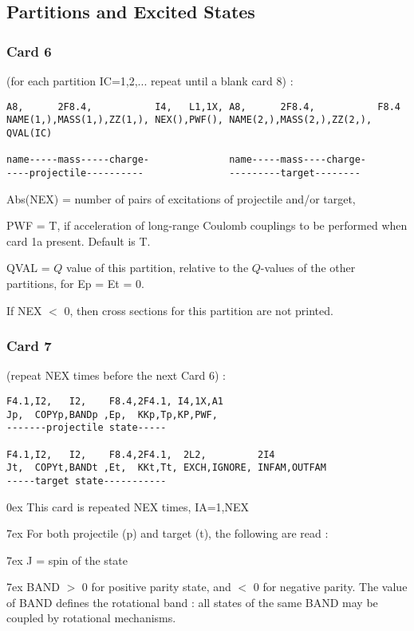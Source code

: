 \documentclass[11pt]{article}
\begin{document}
 
\newpage
\subsection{Partitions and Excited States}
%
\subsubsection*{Card 6}
(for each partition IC=1,2,... repeat until a blank card 8) :
\begin{verbatim}
A8,      2F8.4,           I4,   L1,1X, A8,      2F8.4,           F8.4
NAME(1,),MASS(1,),ZZ(1,), NEX(),PWF(), NAME(2,),MASS(2,),ZZ(2,), QVAL(IC)

name-----mass-----charge-              name-----mass----charge-
----projectile----------               ---------target--------
\end{verbatim}

Abs(NEX) = number of pairs of excitations of projectile and/or target,

PWF = T, if acceleration of long-range Coulomb couplings to be
performed when card 1a present. Default is T.

QVAL = $Q$ value of this partition,
relative to the $Q$-values of the other partitions, for Ep = Et = 0.

If NEX $<$ 0, then cross sections for this partition are not printed.

\subsubsection*{Card 7}
(repeat NEX times before the next Card 6) :
\begin{verbatim}
F4.1,I2,   I2,    F8.4,2F4.1, I4,1X,A1
Jp,  COPYp,BANDp ,Ep,  KKp,Tp,KP,PWF,
-------projectile state-----

F4.1,I2,   I2,    F8.4,2F4.1,  2L2,         2I4
Jt,  COPYt,BANDt ,Et,  KKt,Tt, EXCH,IGNORE, INFAM,OUTFAM
-----target state-----------
\end{verbatim}

\hangindent 0ex
This card is repeated NEX times, IA=1,NEX

\hangindent 7ex
For both projectile (p) and target (t), the following are read :

\hangindent 7ex
J     = spin of the state

\hangindent 7ex
BAND  $>$ 0 for positive parity state, and $<$ 0 for negative parity.
The value of BAND defines the rotational band : all states of the
same BAND may be coupled by rotational mechanisms.
\end{document}
